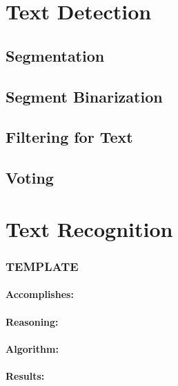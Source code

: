 \section{Text Detection}\label{sec:text-detection}

\subsection{Segmentation}

\subsection{Segment Binarization}

\subsection{Filtering for Text}

\subsection{Voting}

\section{Text Recognition}\label{sec:text-recognition}



\subsubsection{TEMPLATE}
\label{subsubsec:TEMPLATE}

\paragraph*{Accomplishes:}\mbox{}\par

\paragraph*{Reasoning:}\mbox{}\par

\paragraph*{Algorithm:}\mbox{}\par

\paragraph*{Results:}\mbox{}\par
